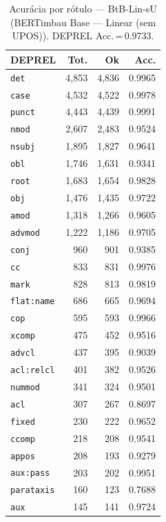 \begin{table}[ht]
\centering
\caption{Acurácia por rótulo --- BtB-Lin-sU (BERTimbau Base — Linear (sem UPOS)). DEPREL Acc.\,=\,0.9733.}
\label{tab:acc-predict-test-ablacao-linear-neuralmind-bert-base-portuguese-cased}
\scriptsize
\begin{tabular}{lrrr}
\toprule
\textbf{DEPREL} & \textbf{Tot.} & \textbf{Ok} & \textbf{Acc.} \\
\midrule
\texttt{det} & 4,853 & 4,836 & 0.9965 \\
\texttt{case} & 4,532 & 4,522 & 0.9978 \\
\texttt{punct} & 4,443 & 4,439 & 0.9991 \\
\texttt{nmod} & 2,607 & 2,483 & 0.9524 \\
\texttt{nsubj} & 1,895 & 1,827 & 0.9641 \\
\texttt{obl} & 1,746 & 1,631 & 0.9341 \\
\texttt{root} & 1,683 & 1,654 & 0.9828 \\
\texttt{obj} & 1,476 & 1,435 & 0.9722 \\
\texttt{amod} & 1,318 & 1,266 & 0.9605 \\
\texttt{advmod} & 1,222 & 1,186 & 0.9705 \\
\texttt{conj} & 960 & 901 & 0.9385 \\
\texttt{cc} & 833 & 831 & 0.9976 \\
\texttt{mark} & 828 & 813 & 0.9819 \\
\texttt{flat\!:\!name} & 686 & 665 & 0.9694 \\
\texttt{cop} & 595 & 593 & 0.9966 \\
\texttt{xcomp} & 475 & 452 & 0.9516 \\
\texttt{advcl} & 437 & 395 & 0.9039 \\
\texttt{acl\!:\!relcl} & 401 & 382 & 0.9526 \\
\texttt{nummod} & 341 & 324 & 0.9501 \\
\texttt{acl} & 307 & 267 & 0.8697 \\
\texttt{fixed} & 230 & 222 & 0.9652 \\
\texttt{ccomp} & 218 & 208 & 0.9541 \\
\texttt{appos} & 208 & 193 & 0.9279 \\
\texttt{aux\!:\!pass} & 203 & 202 & 0.9951 \\
\texttt{parataxis} & 160 & 123 & 0.7688 \\
\texttt{aux} & 145 & 141 & 0.9724 \\

\end{tabular}
\end{table}
